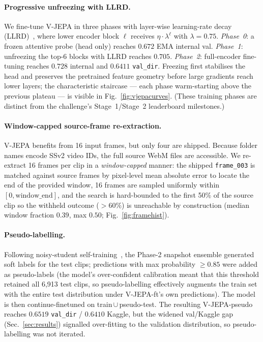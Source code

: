 \documentclass[10pt,twocolumn,letterpaper]{article}
\begin{document}
\paragraph{Progressive unfreezing with LLRD.}
We fine-tune V-JEPA in three phases with layer-wise learning-rate decay
(LLRD)~\cite{howard2018ulmfit,clark2020electra,bao2022beit}, where lower
encoder block $\ell$ receives $\eta\cdot\lambda^{\ell}$ with $\lambda{=}0.75$.
\emph{Phase~0}: a frozen attentive probe (head only) reaches $0.672$ EMA
internal val. \emph{Phase~1}: unfreezing the top-6 blocks with LLRD reaches
$0.705$. \emph{Phase~2}: full-encoder fine-tuning reaches $0.728$ internal and
$0.6411$ \texttt{val\_dir}. Freezing first stabilises the head and preserves the
pretrained feature geometry before large gradients reach lower layers; the
characteristic staircase --- each phase warm-starting above the previous
plateau --- is visible in Fig.~\ref{fig:vjepacurves}.
(These training phases are distinct from the challenge's Stage~1/Stage~2
leaderboard milestones.)

\paragraph{Window-capped source-frame re-extraction.}
V-JEPA benefits from 16 input frames, but only four are shipped. Because folder
names encode SSv2 video IDs, the full source WebM files are accessible. We
re-extract 16 frames per clip in a \emph{window-capped} manner: the shipped
\texttt{frame\_003} is matched against source frames by pixel-level mean
absolute error to locate the end of the provided window, 16 frames are sampled
uniformly within $[0,\text{window\_end}]$, and the search is hard-bounded to the
first 50\% of the source clip so the withheld outcome ($>60\%$) is unreachable by
construction (median window fraction $0.39$, max $0.50$;
Fig.~\ref{fig:framehist}).

\paragraph{Pseudo-labelling.}
Following noisy-student self-training~\cite{xie2020noisystudent,lee2013pseudo},
the Phase-2 snapshot ensemble generated soft labels for the test clips;
predictions with max probability $\geq 0.85$ were added as pseudo-labels (the
model's over-confident calibration meant that this threshold retained all
6{,}913 test clips, so pseudo-labelling effectively augments the train set with
the entire test distribution under V-JEPA-ft's own predictions). The model is
then continue-finetuned on train\,$\cup$\,pseudo-test. The resulting
V-JEPA-pseudo reaches $0.6519$ \texttt{val\_dir} / $0.6410$ Kaggle, but the
widened val/Kaggle gap (Sec.~\ref{sec:results}) signalled over-fitting to the
validation distribution, so pseudo-labelling was not iterated.
\end{document}
